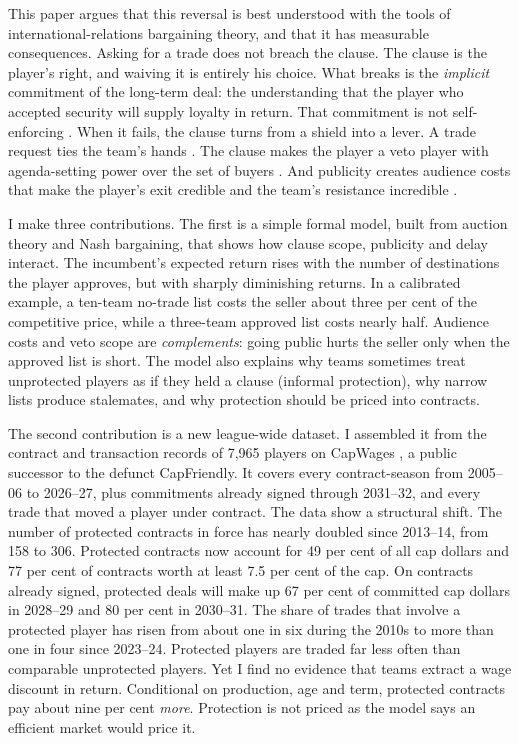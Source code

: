 This paper argues that this reversal is best understood with the tools of international-relations bargaining theory, and that it has measurable consequences. Asking for a trade does not breach the clause. The clause is the player's right, and waiving it is entirely his choice. What breaks is the \emph{implicit} commitment of the long-term deal: the understanding that the player who accepted security will supply loyalty in return. That commitment is not self-enforcing \citep{fearon1995,powell2006}. When it fails, the clause turns from a shield into a lever. A trade request ties the team's hands \citep{schelling1960,fearon1997}. The clause makes the player a veto player with agenda-setting power over the set of buyers \citep{tsebelis2002}. And publicity creates audience costs that make the player's exit credible and the team's resistance incredible \citep{fearon1994,tomz2007}.

I make three contributions. The first is a simple formal model, built from auction theory and Nash bargaining, that shows how clause scope, publicity and delay interact. The incumbent's expected return rises with the number of destinations the player approves, but with sharply diminishing returns. In a calibrated example, a ten-team no-trade list costs the seller about three per cent of the competitive price, while a three-team approved list costs nearly half. Audience costs and veto scope are \emph{complements}: going public hurts the seller only when the approved list is short. The model also explains why teams sometimes treat unprotected players as if they held a clause (informal protection), why narrow lists produce stalemates, and why protection should be priced into contracts.

The second contribution is a new league-wide dataset. I assembled it from the contract and transaction records of 7,965 players on CapWages \citep{capwages}, a public successor to the defunct CapFriendly. It covers every contract-season from 2005--06 to 2026--27, plus commitments already signed through 2031--32, and every trade that moved a player under contract. The data show a structural shift. The number of protected contracts in force has nearly doubled since 2013--14, from 158 to 306. Protected contracts now account for 49 per cent of all cap dollars and 77 per cent of contracts worth at least 7.5 per cent of the cap. On contracts already signed, protected deals will make up 67 per cent of committed cap dollars in 2028--29 and 80 per cent in 2030--31. The share of trades that involve a protected player has risen from about one in six during the 2010s to more than one in four since 2023--24. Protected players are traded far less often than comparable unprotected players. Yet I find no evidence that teams extract a wage discount in return. Conditional on production, age and term, protected contracts pay about nine per cent \emph{more}. Protection is not priced as the model says an efficient market would price it.

